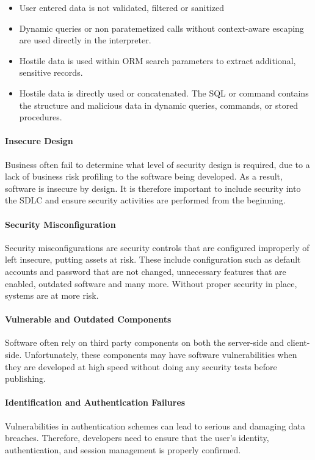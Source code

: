 \begin{itemize}
    \item User entered data is not validated, filtered or sanitized
    \item Dynamic queries or non paratemetized calls without context-aware escaping are used directly in the interpreter.
    \item Hostile data is used within ORM search parameters to extract additional, sensitive records.
    \item Hostile data is directly used or concatenated. The SQL or command contains the structure and malicious data in dynamic queries, commands, or stored procedures.
\end{itemize}

\paragraph{Insecure Design}
Business often fail to determine what level of security design is required, due to a lack of business risk profiling to the software being developed. As a result, software is insecure by design. It is therefore important to include security into the SDLC and ensure security activities are performed from the beginning.

\paragraph{Security Misconfiguration}
Security misconfigurations are security controls that are configured improperly of left insecure, putting assets at risk. These include configuration such as default accounts and password that are not changed, unnecessary features that are enabled, outdated software and many more. Without proper security in place, systems are at more risk.

\paragraph{Vulnerable and Outdated Components}
Software often rely on third party components on both the server-side and client-side. Unfortunately, these components may have software vulnerabilities when they are developed at high speed without doing any security tests before publishing.

\paragraph{Identification and Authentication Failures}
Vulnerabilities in authentication schemes can lead to serious and damaging data breaches. Therefore, developers need to ensure that the user's identity, authentication, and session management is properly confirmed.

